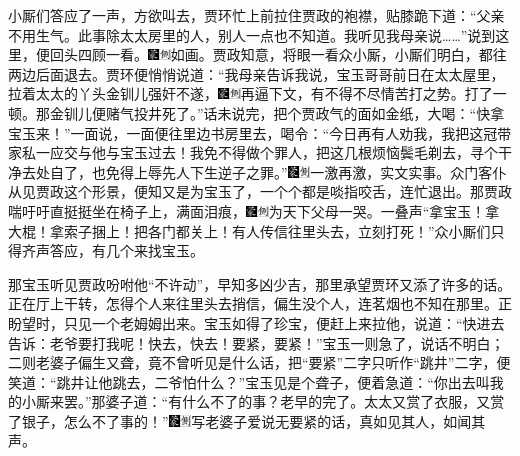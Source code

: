 小厮们答应了一声，方欲叫去，贾环忙上前拉住贾政的袍襟，贴膝跪下道：``父亲不用生气。此事除太太房里的人，别人一点也不知道。我听见我母亲说\ldots{}\ldots{}''说到这里，便回头四顾一看。{\includegraphics[width=3mm]{../Images/00006}\includegraphics[width=3mm]{../Images/00011}\footnotesize \kaishu 如画。}贾政知意，将眼一看众小厮，小厮们明白，都往两边后面退去。贾环便悄悄说道：``我母亲告诉我说，宝玉哥哥前日在太太屋里，拉着太太的丫头金钏儿强奸不遂，{\includegraphics[width=3mm]{../Images/00006}\includegraphics[width=3mm]{../Images/00011}\footnotesize \kaishu 再逼下文，有不得不尽情苦打之势。}打了一顿。那金钏儿便赌气投井死了。''话未说完，把个贾政气的面如金纸，大喝：``快拿宝玉来！''一面说，一面便往里边书房里去，喝令：``今日再有人劝我，我把这冠带家私一应交与他与宝玉过去！我免不得做个罪人，把这几根烦恼鬓毛剃去，寻个干净去处自了，也免得上辱先人下生逆子之罪。''{\includegraphics[width=3mm]{../Images/00006}\includegraphics[width=3mm]{../Images/00011}\footnotesize \kaishu 一激再激，实文实事。}众门客仆从见贾政这个形景，便知又是为宝玉了，一个个都是啖指咬舌，连忙退出。那贾政喘吁吁直挺挺坐在椅子上，满面泪痕，{\includegraphics[width=3mm]{../Images/00006}\includegraphics[width=3mm]{../Images/00011}\footnotesize \kaishu 为天下父母一哭。}一叠声``拿宝玉！拿大棍！拿索子捆上！把各门都关上！有人传信往里头去，立刻打死！''众小厮们只得齐声答应，有几个来找宝玉。

那宝玉听见贾政吩咐他``不许动''，早知多凶少吉，那里承望贾环又添了许多的话。正在厅上干转，怎得个人来往里头去捎信，偏生没个人，连茗烟也不知在那里。正盼望时，只见一个老姆姆出来。宝玉如得了珍宝，便赶上来拉他，说道：``快进去告诉：老爷要打我呢！快去，快去！要紧，要紧！''宝玉一则急了，说话不明白；二则老婆子偏生又聋，竟不曾听见是什么话，把``要紧''二字只听作``跳井''二字，便笑道：``跳井让他跳去，二爷怕什么？''宝玉见是个聋子，便着急道：``你出去叫我的小厮来罢。''那婆子道：``有什么不了的事？老早的完了。太太又赏了衣服，又赏了银子，怎么不了事的！''{\includegraphics[width=3mm]{../Images/00006}\includegraphics[width=3mm]{../Images/00011}\footnotesize \kaishu 写老婆子爱说无要紧的话，真如见其人，如闻其声。}

